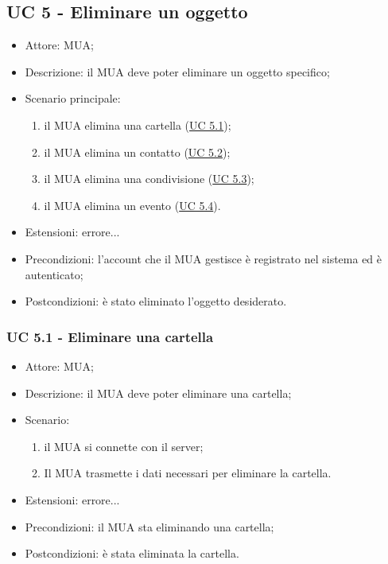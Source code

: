     \subsection{UC 5 - Eliminare un oggetto} \label{sec: UC 5}
    \begin{itemize}
        \item Attore: MUA;
        \item Descrizione: il MUA deve poter eliminare un oggetto specifico;
        \item Scenario principale:
            \begin{enumerate}
            \item il MUA elimina una cartella (\hyperref[sec: UC 5.1]{UC 5.1});
            \item il MUA elimina un contatto (\hyperref[sec: UC 5.2]{UC 5.2});
            \item il MUA elimina una condivisione (\hyperref[sec: UC 5.3]{UC 5.3});
            \item il MUA elimina un evento (\hyperref[sec: UC 5.4]{UC 5.4}).
            \end{enumerate}
        \item Estensioni: errore...
        \item Precondizioni: l’account che il MUA gestisce è registrato nel sistema ed è autenticato;
        \item Postcondizioni: è stato eliminato l’oggetto desiderato.
    \end{itemize}

    \subsubsection{UC 5.1 - Eliminare una cartella} \label{sec: UC 5.1}
    \begin{itemize}
        \item Attore: MUA;
        \item Descrizione: il MUA deve poter eliminare una cartella;
        \item Scenario:
        \begin{enumerate}
        \item il MUA si connette con il server;
        \item Il MUA trasmette i dati necessari per eliminare la cartella.
        \end{enumerate}
        \item Estensioni: errore...
        \item Precondizioni: il MUA sta eliminando una cartella;
        \item Postcondizioni: è stata eliminata la cartella.
    \end{itemize}

